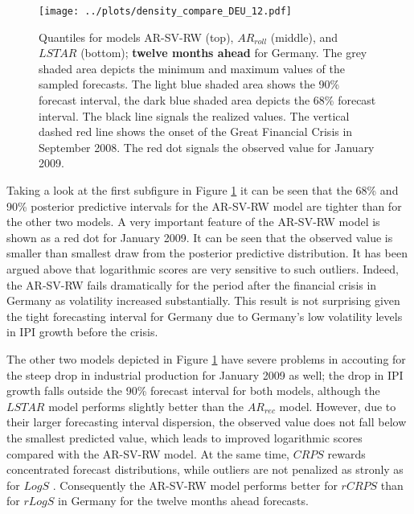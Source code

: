 \documentclass[12pt,letterpaper,fleqn]{article}           %
\begin{document}
\begin{figure}
\centering \texttt{[image: ../plots/density\_compare\_DEU\_12.pdf]} 
\caption{Quantiles for models AR-SV-RW (top), $AR_{roll}$ (middle), and $LSTAR$ (bottom); \textbf{twelve months ahead} for Germany. The grey shaded area depicts the minimum and maximum values of the sampled forecasts. The light blue shaded area shows the 90\% forecast interval, the dark blue shaded area depicts the 68\% forecast interval. The black line signals the realized values. The vertical dashed red line shows the onset of the Great Financial Crisis in September 2008. The red dot signals the observed value for January 2009.}
\label{fig:deu_dens} 
\end{figure}

Taking a look at the first subfigure in Figure \ref{fig:deu_dens} it can be seen that the 68\% and 90\% posterior predictive intervals for the AR-SV-RW model are tighter than for the other two models. %
A very important feature of the AR-SV-RW model is shown as a red dot for January 2009. It can be seen that the observed value is smaller than smallest draw from the posterior predictive distribution. It has been argued above that logarithmic scores are very sensitive to such outliers. Indeed, the AR-SV-RW fails dramatically for the period after the financial crisis in Germany as volatility increased substantially. This result is not surprising given the tight forecasting interval for Germany due to Germany's low volatility levels in IPI growth before the crisis. 

The other two models depicted in Figure \ref{fig:deu_dens} have severe problems in accouting for the steep drop in industrial production for January 2009 as well; the drop in IPI growth falls outside the 90\% forecast interval for both models, although the $LSTAR$ model performs slightly better than the $AR_{rec}$ model. However, due to their larger forecasting interval dispersion, the observed value does not fall below the smallest predicted value, which leads to improved logarithmic scores compared with the AR-SV-RW model. At the same time, $CRPS$ rewards concentrated forecast distributions, while outliers are not penalized as stronly as for $LogS$ \parencite{krueger19}. Consequently the AR-SV-RW model performs better for $rCRPS$ than for $rLogS$ in Germany for the twelve months ahead forecasts.
\end{document}
